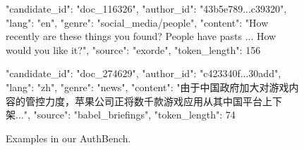 \documentclass[11pt]{article}
\begin{document}


\begin{figure}[h!]
\centering

\begin{jsonexample}{}
\begin{JSONVerbatim}
{
  "candidate_id": "doc_116326",
  "author_id": "43b5e789...c39320",
  "lang": "en",
  "genre": "social_media/people",
  "content": "How recently are these things you found? People have pasts ... How would you like it?",
  "source": "exorde",
  "token_length": 156
}
\end{JSONVerbatim}
\end{jsonexample}

\vspace{6pt}

\begin{jsonexample}{}
\begin{JSONVerbatim}
{
  "candidate_id": "doc_274629",
  "author_id": "c423340f...30add",
  "lang": "zh",
  "genre": "news",
  "content": "由于中国政府加大对游戏内容的管控力度，苹果公司正将数千款游戏应用从其中国平台上下架...",
  "source": "babel_briefings",
  "token_length": 74
}
\end{JSONVerbatim}
\end{jsonexample}

\caption{Examples in our AuthBench.}
\label{fig:json-examples}
\end{figure}
\end{document}
